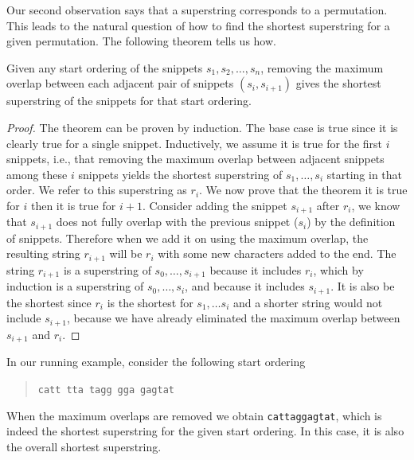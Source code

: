 \begin{gram}
Our second observation says that a superstring corresponds to a
permutation.  This leads to the natural question of how to find the
shortest superstring for a given permutation.
%
The following theorem tells us how.
\end{gram}

\begin{flex}
\begin{theorem}   
Given any start ordering of the snippets $s_1,s_2, \ldots, s_n$,
removing the maximum overlap between each adjacent pair of snippets
$(s_i,s_{i+1})$ gives the shortest superstring of the snippets for
that start ordering.
\end{theorem}
\begin{proof}
The theorem can be proven by induction.  
%
The base case is true since it is clearly true for a single snippet.
%
Inductively, we assume it is true for the first $i$ snippets, i.e.,
that removing the maximum overlap between adjacent snippets among
these $i$ snippets yields the shortest superstring of $s_1, \ldots,
s_i$ starting in that order.  
%
We refer to this superstring as $r_i$.
%
We now prove that the theorem it is true for $i$ then it is true for
${i+1}$.
%
Consider adding the snippet $s_{i+1}$ after $r_i$, we know that
$s_{i+1}$ does not fully overlap with the previous snippet ($s_{i}$)
by the definition of snippets.
%
Therefore when we add it on using the maximum
overlap, the resulting string $r_{i+1}$ will be $r_i$ with some new characters
added to the end.  
%
The string $r_{i+1}$ is a superstring of $s_0, \ldots, s_{i+1}$
because it includes $r_i$, which by induction is a superstring of
$s_0, \ldots, s_{i}$, and because it includes $s_{i+1}$.
%
It is also be the shortest since $r_i$ is the shortest for $s_1,
\ldots s_i$ and a shorter string would not include $s_{i+1}$, because
we have already eliminated the maximum overlap between $s_{i+1}$ and
$r_i$.
\end{proof}


\end{flex}

\begin{example}
In our running example, consider the following start ordering
\begin{quote}
  \texttt{catt}\, \texttt{tta}\, \texttt{tagg}\,
  \texttt{gga}\, \texttt{gagtat}
\end{quote}
When the maximum overlaps are removed we obtain \texttt{cattaggagtat},
which is indeed the shortest superstring for the given start ordering.
In this case, it is also the overall shortest superstring.
\end{example}


